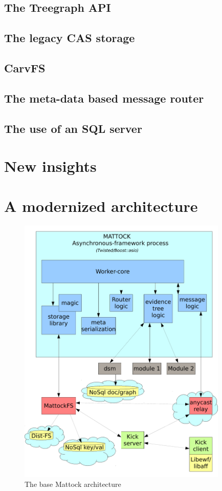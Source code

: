 \subsection{The Treegraph API}
\subsection{The legacy CAS storage}
\subsection{CarvFS}
\subsection{The meta-data based message router}
\subsection{The use of an SQL server}
\section{New insights}
\section{A modernized architecture}
\begin{figure}
\centering
\includegraphics[width=100mm]{mattock/libraryviewmattock.pdf}
\caption{The base Mattock architecture}
\label{fig:FlowInOut}
\end{figure}
